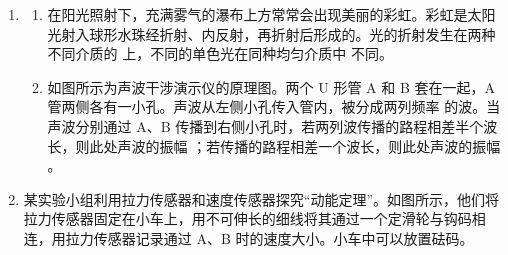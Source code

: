 \documentclass[\gkver]{gaokaozhenti}
\begin{document}
\begin{enumerate}


\item
\begin{enumerate}
	\item
	在阳光照射下，充满雾气的瀑布上方常常会出现美丽的彩虹。彩虹是太阳光射入球形水珠经折射、内反射，再折射后形成的。光的折射发生在两种不同介质的 \tkanswer[2cm]{} 上，不同的单色光在同种均匀介质中 \tkanswer[2cm]{} 不同。
	\item
	如图所示为声波干涉演示仪的原理图。两个 U 形管 A 和 B 套在一起，A 管两侧各有一小孔。声波从左侧小孔传入管内，被分成两列频率 \tkanswer[2cm]{} 的波。当声波分别通过 A、B 传播到右侧小孔时，若两列波传播的路程相差半个波长，则此处声波的振幅 \tkanswer[3cm]{}；若传播的路程相差一个波长，则此处声波的振幅 \tkanswer[3cm]{}。
\end{enumerate}



\item
某实验小组利用拉力传感器和速度传感器探究“动能定理”。如图所示，他们将拉力传感器固定在小车上，用不可伸长的细线将其通过一个定滑轮与钩码相连，用拉力传感器记录通过 A、B 时的速度大小。小车中可以放置砝码。


\end{enumerate}
\end{document}
